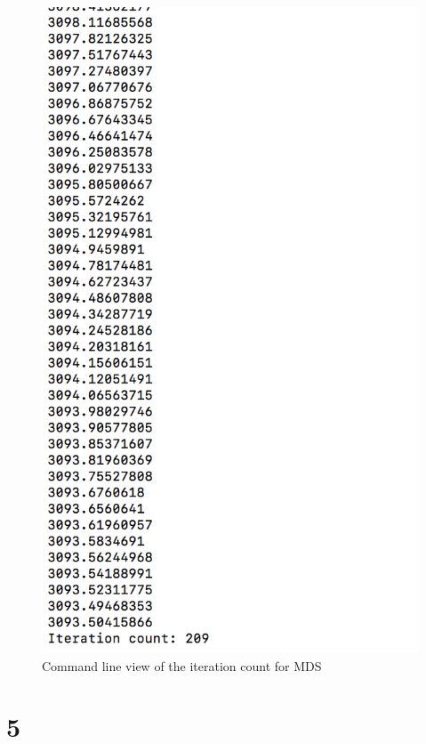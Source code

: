 \documentclass[letterpaper,11pt]{article}
\begin{document}
 \begin{figure}[h]
 \centering
 \includegraphics[scale=0.75]{q4itercount}
 \caption{Command line view of the iteration count for MDS}
 \label{fig:scaledown}
 \end{figure}

\clearpage


\section*{5}
\end{document}
